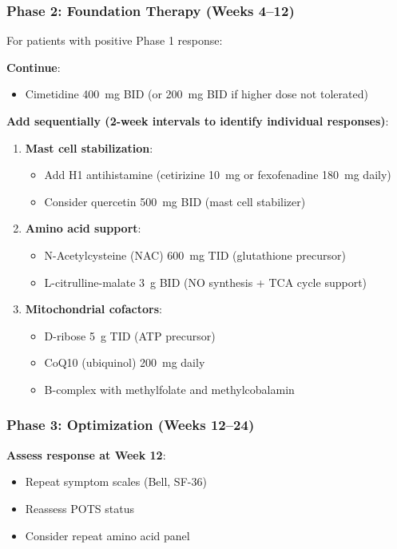 \subsubsection{Phase 2: Foundation Therapy (Weeks 4--12)}

For patients with positive Phase 1 response:

\textbf{Continue}:
\begin{itemize}
    \item Cimetidine 400~mg BID (or 200~mg BID if higher dose not tolerated)
\end{itemize}

\textbf{Add sequentially (2-week intervals to identify individual responses)}:
\begin{enumerate}
    \item \textbf{Mast cell stabilization}:
    \begin{itemize}
        \item Add H1 antihistamine (cetirizine 10~mg or fexofenadine 180~mg daily)
        \item Consider quercetin 500~mg BID (mast cell stabilizer)
    \end{itemize}

    \item \textbf{Amino acid support}:
    \begin{itemize}
        \item N-Acetylcysteine (NAC) 600~mg TID (glutathione precursor)
        \item L-citrulline-malate 3~g BID (NO synthesis + TCA cycle support)
    \end{itemize}

    \item \textbf{Mitochondrial cofactors}:
    \begin{itemize}
        \item D-ribose 5~g TID (ATP precursor)
        \item CoQ10 (ubiquinol) 200~mg daily
        \item B-complex with methylfolate and methylcobalamin
    \end{itemize}
\end{enumerate}

\subsubsection{Phase 3: Optimization (Weeks 12--24)}

\textbf{Assess response at Week 12}:
\begin{itemize}
    \item Repeat symptom scales (Bell, SF-36)
    \item Reassess POTS status
    \item Consider repeat amino acid panel
\end{itemize}

